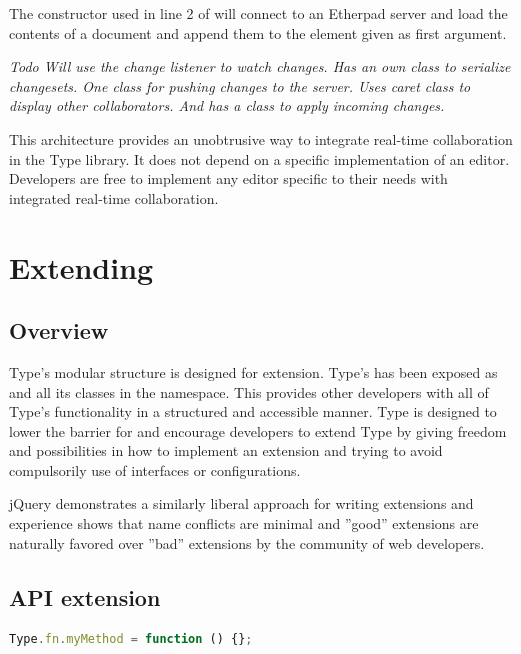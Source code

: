 The constructor used in line 2 of  will connect to an Etherpad server and load the contents of a document and append them to the element given as first argument.

\textit{Todo Will use the change listener to watch changes. Has an own class to serialize changesets. One class for pushing changes to the server. Uses caret class to display other collaborators. And has a class to apply incoming changes.}

This architecture provides an unobtrusive way to integrate real-time collaboration in the Type library. It does not depend on a specific implementation of an editor. Developers are free to implement any editor specific to their needs with integrated real-time collaboration.




\section{Extending}
\label{sec:extensions}

\subsection{Overview}

Type's modular structure is designed for extension. Type's  has been exposed as  and all its classes in the  namespace. This provides other developers with all of Type's functionality in a structured and accessible manner. Type is designed to lower the barrier for and encourage developers to extend Type by giving freedom and possibilities in how to implement an extension and trying to avoid compulsorily use of interfaces or configurations.

jQuery demonstrates a similarly liberal approach for writing extensions and experience shows that name conflicts are minimal and ''good'' extensions are naturally favored over ''bad'' extensions by the community of web developers.

\subsection{API extension}

\begin{lstlisting}[language=JavaScript, caption=Example Type instance API extension, label=lst:api_extension_example]
Type.fn.myMethod = function () {};
\end{lstlisting}

